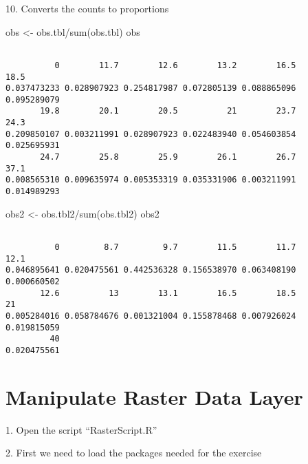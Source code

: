 \documentclass[
  letterpaper,
]{book}
\newenvironment{Shaded}{\begin{snugshade}}{\end{snugshade}}
\newcommand{\FunctionTok}[1]{\textcolor[rgb]{0.28,0.35,0.67}{#1}}
\newcommand{\NormalTok}[1]{\textcolor[rgb]{0.00,0.23,0.31}{#1}}
\newcommand{\OtherTok}[1]{\textcolor[rgb]{0.00,0.23,0.31}{#1}}
\newcommand{\SpecialCharTok}[1]{\textcolor[rgb]{0.37,0.37,0.37}{#1}}
\begin{document}
10. Converts the counts to proportions

\begin{Shaded}
\begin{Highlighting}[]
\NormalTok{obs }\OtherTok{\textless{}{-}}\NormalTok{ obs.tbl}\SpecialCharTok{/}\FunctionTok{sum}\NormalTok{(obs.tbl)}
\NormalTok{obs}
\end{Highlighting}
\end{Shaded}

\begin{verbatim}

          0        11.7        12.6        13.2        16.5        18.5 
0.037473233 0.028907923 0.254817987 0.072805139 0.088865096 0.095289079 
       19.8        20.1        20.5          21        23.7        24.3 
0.209850107 0.003211991 0.028907923 0.022483940 0.054603854 0.025695931 
       24.7        25.8        25.9        26.1        26.7        37.1 
0.008565310 0.009635974 0.005353319 0.035331906 0.003211991 0.014989293 
\end{verbatim}

\begin{Shaded}
\begin{Highlighting}[]
\NormalTok{obs2 }\OtherTok{\textless{}{-}}\NormalTok{ obs.tbl2}\SpecialCharTok{/}\FunctionTok{sum}\NormalTok{(obs.tbl2)}
\NormalTok{obs2}
\end{Highlighting}
\end{Shaded}

\begin{verbatim}

          0         8.7         9.7        11.5        11.7        12.1 
0.046895641 0.020475561 0.442536328 0.156538970 0.063408190 0.000660502 
       12.6          13        13.1        16.5        18.5          21 
0.005284016 0.058784676 0.001321004 0.155878468 0.007926024 0.019815059 
         40 
0.020475561 
\end{verbatim}

\hypertarget{manipulate-raster-data-layer}{%
\chapter{Manipulate Raster Data
Layer}\label{manipulate-raster-data-layer}}

1. Open the script ``RasterScript.R''

2. First we need to load the packages needed for the exercise
\end{document}
